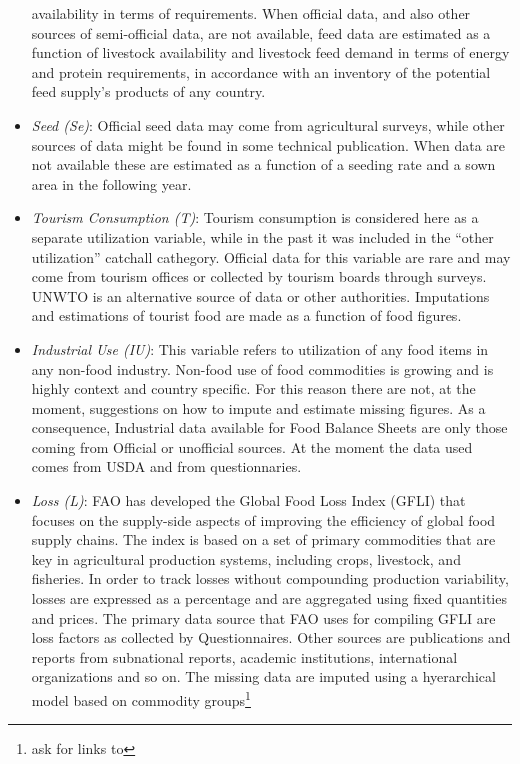 \documentclass[]{article}
\let\rmarkdownfootnote\footnote%
\def\footnote{\protect\rmarkdownfootnote}
\begin{document}
\begin{itemize}
  availability in terms of requirements. When official data, and also
  other sources of semi-official data, are not available, feed data are
  estimated as a function of livestock availability and livestock feed
  demand in terms of energy and protein requirements, in accordance with
  an inventory of the potential feed supply's products of any country.
\item
  \emph{Seed (Se)}: Official seed data may come from agricultural
  surveys, while other sources of data might be found in some technical
  publication. When data are not available these are estimated as a
  function of a seeding rate and a sown area in the following year.
\item
  \emph{Tourism Consumption (T)}: Tourism consumption is considered here
  as a separate utilization variable, while in the past it was included
  in the ``other utilization'' catchall cathegory. Official data for
  this variable are rare and may come from tourism offices or collected
  by tourism boards through surveys. UNWTO is an alternative source of
  data or other authorities. Imputations and estimations of tourist food
  are made as a function of food figures.
\item
  \emph{Industrial Use (IU)}: This variable refers to utilization of any
  food items in any non-food industry. Non-food use of food commodities
  is growing and is highly context and country specific. For this reason
  there are not, at the moment, suggestions on how to impute and
  estimate missing figures. As a consequence, Industrial data available
  for Food Balance Sheets are only those coming from Official or
  unofficial sources. At the moment the data used comes from USDA and
  from questionnaries.
\item
  \emph{Loss (L)}: FAO has developed the Global Food Loss Index (GFLI)
  that focuses on the supply-side aspects of improving the efficiency of
  global food supply chains. The index is based on a set of primary
  commodities that are key in agricultural production systems, including
  crops, livestock, and fisheries. In order to track losses without
  compounding production variability, losses are expressed as a
  percentage and are aggregated using fixed quantities and prices. The
  primary data source that FAO uses for compiling GFLI are loss factors
  as collected by Questionnaires. Other sources are publications and
  reports from subnational reports, academic institutions, international
  organizations and so on. The missing data are imputed using a
  hyerarchical model based on commodity groups\footnote{ask for links to
}
\end{itemize}
\end{document}
